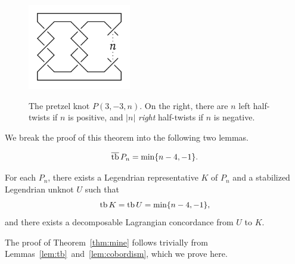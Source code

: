 \begin{figure}[ht!]
    \centering
    \includegraphics[width=0.4\textwidth]{images/pretzel-knot.pdf}
    \label{fig:pretzel-knot}
    \caption{The pretzel knot $P(3, -3, n)$. On the right, there are $n$ left half-twists if $n$ is positive, and $|n|$ \emph{right} half-twists if $n$ is negative.}
\end{figure}

We break the proof of this theorem into the following two lemmas.
\begin{lemma}\label{lem:tb}
    \[
        \overline{\operatorname{tb}}\, P_n = \min \{ n-4, -1\}.
    \]
\end{lemma}

\begin{lemma}\label{lem:cobordism}
    For each $P_n$, there exists a Legendrian representative $K$ of $P_n$ and a stabilized Legendrian unknot $U$ such that 
    \[
        \operatorname{tb} K = \operatorname{tb} U = \min \{n-4, -1\},
    \]
    and there exists a decomposable Lagrangian concordance from $U$ to $K$.
\end{lemma}

The proof of Theorem~\ref{thm:mine} follows trivially from Lemmas~\ref{lem:tb}~and~\ref{lem:cobordism}, which we prove here.


